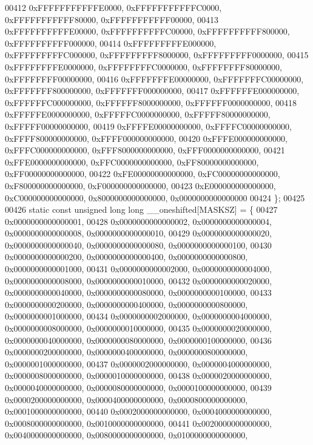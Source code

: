 \begin{DoxyCode}
00412         0xFFFFFFFFFFFE0000, 0xFFFFFFFFFFFC0000, 0xFFFFFFFFFFF80000, 0xFFFFFFFFFFF00000,
00413         0xFFFFFFFFFFE00000, 0xFFFFFFFFFFC00000, 0xFFFFFFFFFF800000, 0xFFFFFFFFFF000000,
00414         0xFFFFFFFFFE000000, 0xFFFFFFFFFC000000, 0xFFFFFFFFF8000000, 0xFFFFFFFFF0000000,
00415         0xFFFFFFFFE0000000, 0xFFFFFFFFC0000000, 0xFFFFFFFF80000000, 0xFFFFFFFF00000000,
00416         0xFFFFFFFE00000000, 0xFFFFFFFC00000000, 0xFFFFFFF800000000, 0xFFFFFFF000000000,
00417         0xFFFFFFE000000000, 0xFFFFFFC000000000, 0xFFFFFF8000000000, 0xFFFFFF0000000000,
00418         0xFFFFFE0000000000, 0xFFFFFC0000000000, 0xFFFFF80000000000, 0xFFFFF00000000000,
00419         0xFFFFE00000000000, 0xFFFFC00000000000, 0xFFFF800000000000, 0xFFFF000000000000,
00420         0xFFFE000000000000, 0xFFFC000000000000, 0xFFF8000000000000, 0xFFF0000000000000,
00421         0xFFE0000000000000, 0xFFC0000000000000, 0xFF80000000000000, 0xFF00000000000000,
00422         0xFE00000000000000, 0xFC00000000000000, 0xF800000000000000, 0xF000000000000000,
00423         0xE000000000000000, 0xC000000000000000, 0x8000000000000000, 0x0000000000000000
00424 \};
00425 
00426 \textcolor{keyword}{static} \textcolor{keyword}{const} \textcolor{keywordtype}{unsigned} \textcolor{keywordtype}{long} \textcolor{keywordtype}{long} \_\_oneshifted[MASKSZ] = \{
00427         0x0000000000000001,
00428         0x0000000000000002, 0x0000000000000004, 0x0000000000000008, 0x0000000000000010,
00429         0x0000000000000020, 0x0000000000000040, 0x0000000000000080, 0x0000000000000100,
00430         0x0000000000000200, 0x0000000000000400, 0x0000000000000800, 0x0000000000001000,
00431         0x0000000000002000, 0x0000000000004000, 0x0000000000008000, 0x0000000000010000,
00432         0x0000000000020000, 0x0000000000040000, 0x0000000000080000, 0x0000000000100000,
00433         0x0000000000200000, 0x0000000000400000, 0x0000000000800000, 0x0000000001000000,
00434         0x0000000002000000, 0x0000000004000000, 0x0000000008000000, 0x0000000010000000,
00435         0x0000000020000000, 0x0000000040000000, 0x0000000080000000, 0x0000000100000000,
00436         0x0000000200000000, 0x0000000400000000, 0x0000000800000000, 0x0000001000000000,
00437         0x0000002000000000, 0x0000004000000000, 0x0000008000000000, 0x0000010000000000,
00438         0x0000020000000000, 0x0000040000000000, 0x0000080000000000, 0x0000100000000000,
00439         0x0000200000000000, 0x0000400000000000, 0x0000800000000000, 0x0001000000000000,
00440         0x0002000000000000, 0x0004000000000000, 0x0008000000000000, 0x0010000000000000,
00441         0x0020000000000000, 0x0040000000000000, 0x0080000000000000, 0x0100000000000000,

\end{DoxyCode}

